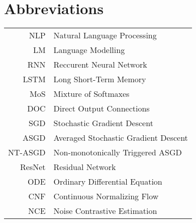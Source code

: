 \chapter{Abbreviations}

\begin{table}[h]
    \centering
    \begin{tabular}{r l}
        NLP & Natural Language Processing \\
        LM & Language Modelling \\
        RNN & Reccurent Neural Network \\
        LSTM & Long Short-Term Memory \\
        MoS & Mixture of Softmaxes \\
        DOC & Direct Output Connections \\
        SGD & Stochastic Gradient Descent \\
        ASGD & Averaged Stochastic Gradient Descent \\
        NT-ASGD & Non-monotonically Triggered ASGD \\
        ResNet & Residual Network \\
        ODE & Ordinary Differential Equation \\
        CNF & Continuous Normalizing Flow \\
        NCE & Noise Contrastive Estimation \\
    \end{tabular}
\end{table}


